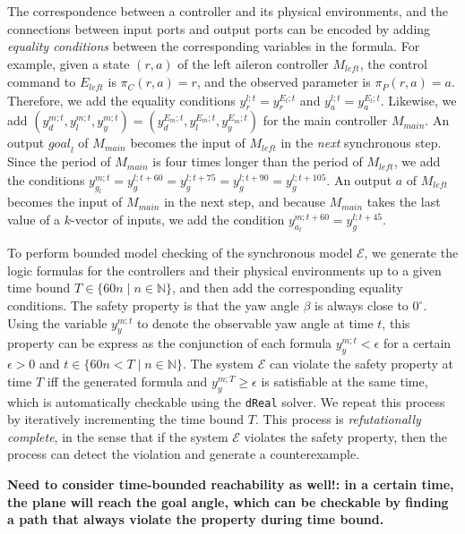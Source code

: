 \documentclass{sig-alternate}
\begin{document}
The correspondence between a controller and its physical environments,
and the connections between input ports and output ports 
can be encoded
by adding   
\emph{equality conditions} between the corresponding variables
in the formula.
For example, 
given a state $(r, a)$ of the left 
aileron controller $M_\mathit{left}$,
the control command to $E_\mathit{left}$ is $\pi_C(r,a) = r$,
and the observed parameter is $\pi_P(r,a) = a$.
Therefore, we add the 
equality conditions 
$y_{r}^{l;t} = y_{r}^{E_l;t}$ and $y_{a}^{l;t} = y_{a}^{E_l;t}$.
Likewise, we add $(y_d^{m;t}, y_l^{m;t}, y_y^{m;t}) = (y_d^{E_m;t},  y_l^{E_m;t}, y_y^{E_m;t})$
for the main controller $M_\mathit{main}$.
An output $\mathit{goal}_l$ of $M_\mathit{main}$
becomes the input of $M_\mathit{left}$ in the \emph{next} synchronous step.
Since the period of $M_\mathit{main}$ is four times longer than the period of $M_\mathit{left}$,
we add 
the conditions 
$y_{g_l}^{m;t} = y_{g}^{l;t + 60} =  y_{g}^{l;t + 75} 
=  y_{g}^{l;t + 90} = y_{g}^{l;t + 105}$.
An output $a$ of  $M_\mathit{left}$
becomes the input of $M_\mathit{main}$ in the next step,
and because $M_\mathit{main}$ takes the last value of a $k$-vector of inputs,
we add the condition  $y_{a_l}^{m;t + 60} = y_{g}^{l;t + 45}$.




To perform bounded model checking of the synchronous model $\mathcal{E}$,
we generate the logic formulas for the controllers and their physical environments
up to a given time bound $T \in \{60 n \mid n \in \mathbb{N}\}$,
and then add the corresponding equality conditions.
The safety property %
is that 
the yaw angle $\beta$ is always close to $0^\circ$.
Using the variable $y_y^{m;t}$ to denote the observable yaw angle at time $t$,
this property can be express as the conjunction of each formula $y_y^{m;t} < \epsilon$ for 
a certain $\epsilon > 0$ and $t \in \{60 n < T\mid n \in \mathbb{N}\}$.
The system $\mathcal{E}$ can violate the safety property 
at time $T$
iff the generated formula and $y_y^{m;T} \geq \epsilon$
is satisfiable at the same time,
which is automatically checkable using the \texttt{dReal} solver.
We repeat this process by iteratively incrementing the time bound $T$.
This process is \emph{refutationally complete},
in the sense that 
if the system $\mathcal{E}$ violates the safety property,
then  the process can detect the violation and generate a counterexample.




\textbf{Need to consider time-bounded reachability as well!: in a certain time, 
the plane will reach the goal angle, which can be checkable by finding
a path that always violate the property during time bound.}
\end{document}
